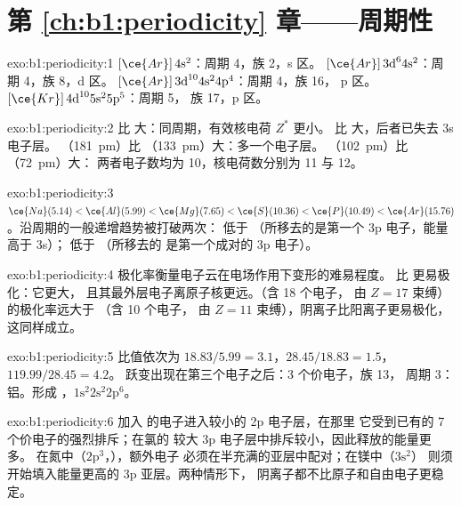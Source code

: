 \section*{第 \ref{ch:b1:periodicity} 章——周期性}

\begin{solution}{exo:b1:periodicity:1}
 $[\ce{Ar}]\,4\text{s}^2$：周期 4，族 2，s 区。
$[\ce{Ar}]\,3\text{d}^6 4\text{s}^2$：周期 4，族 8，d 区。
$[\ce{Ar}]\,3\text{d}^{10} 4\text{s}^2 4\text{p}^4$：周期 4，族 16，
p 区。 $[\ce{Kr}]\,4\text{d}^{10} 5\text{s}^2 5\text{p}^5$：周期 5，
族 17，p 区。
\end{solution}

\begin{solution}{exo:b1:periodicity:2}
 比  大：同周期，有效核电荷 $Z^{*}$ 更小。
 比  大，后者已失去 3s 电子层。
（\qty{181}{pm}）比 （\qty{133}{pm}）大：多一个电子层。
（\qty{102}{pm}）比 （\qty{72}{pm}）大：
两者电子数均为 10，核电荷数分别为 11 与 12。
\end{solution}

\begin{solution}{exo:b1:periodicity:3}
$\ce{Na} (5.14) < \ce{Al} (5.99) < \ce{Mg} (7.65) < \ce{S} (10.36) <
\ce{P} (10.49) < \ce{Ar} (15.76)$。沿周期的一般递增趋势被打破两次：
 低于 （所移去的是第一个
3p 电子，能量高于 3s）； 低于 （所移去的
是第一个成对的 3p 电子）。
\end{solution}

\begin{solution}{exo:b1:periodicity:4}
极化率衡量电子云在电场作用下变形的难易程度。
 比  更易极化：它更大，
且其最外层电子离原子核更远。（含 18 个电子，
由 $Z = 17$ 束缚）的极化率远大于 （含 10 个电子，
由 $Z = 11$ 束缚），阴离子比阳离子更易极化，这同样成立。
\end{solution}

\begin{solution}{exo:b1:periodicity:5}
比值依次为 $18.83/5.99 = 3.1$，$28.45/18.83 = 1.5$，$119.99/28.45 = 4.2$。
跃变出现在第三个电子之后：3 个价电子，族 13，
周期 3：铝。形成 ，$1\text{s}^2 2\text{s}^2
2\text{p}^6$。
\end{solution}

\begin{solution}{exo:b1:periodicity:6}
加入  的电子进入较小的 2p 电子层，在那里
它受到已有的 7 个价电子的强烈排斥；在氯的
较大 3p 电子层中排斥较小，因此释放的能量更多。
在氮中（$2\text{p}^3$，），额外电子
必须在半充满的亚层中配对；在镁中（$3\text{s}^2$）
则须开始填入能量更高的 3p 亚层。两种情形下，
阴离子都不比原子和自由电子更稳定。
\end{solution}


